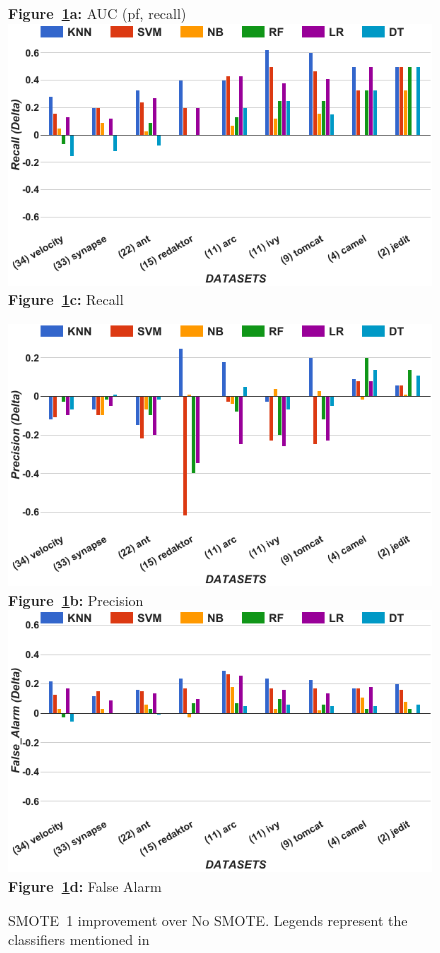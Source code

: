 \begin{figure}[!t]
\begin{minipage}{.5\linewidth}
  {\bf Figure~\ref{fig:untuned}a:} AUC (pf, recall)
        \includegraphics[width=.95\linewidth]{./fig/Recall_untuned.png}
  {\bf Figure~\ref{fig:untuned}c:} Recall
    \end{minipage}%
\begin{minipage}{.5\linewidth}
        \centering
        \includegraphics[width=.95\linewidth]{./fig/prec_untuned.png}
  {\bf Figure~\ref{fig:untuned}b:} Precision
        \includegraphics[width=.95\linewidth]{./fig/pf_untuned.png}
  {\bf Figure~\ref{fig:untuned}d:} False Alarm
    \end{minipage}%
    \caption{SMOTE~1 improvement over No SMOTE. Legends represent the classifiers mentioned in }
    \label{fig:untuned}
\end{figure}

